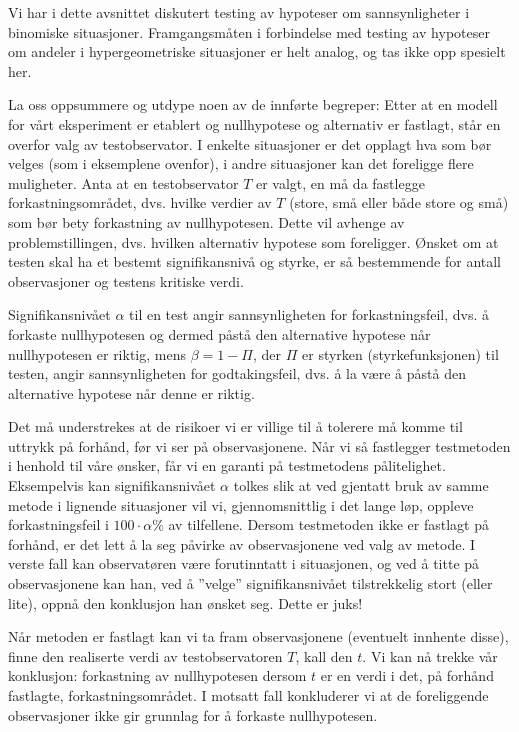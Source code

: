 Vi har i dette avsnittet diskutert
testing av hypoteser om sannsynligheter i binomiske situasjoner.
Framgangsmåten i forbindelse med testing av hypoteser om andeler
i hypergeometriske situasjoner er helt analog, og tas ikke opp
spesielt her.                                                       

La oss oppsummere og utdype noen av de innførte begreper:
Etter at en modell for vårt eksperiment er etablert og nullhypotese og
alternativ er fastlagt, står en overfor
valg av testobservator. I enkelte situasjoner er det opplagt hva
som bør velges (som i eksemplene ovenfor), i andre situasjoner kan
det foreligge flere muligheter. Anta at en testobservator $T$ er
valgt, en må da fastlegge forkastningsområdet, dvs. hvilke verdier
av $T$ (store, små eller både store og små) som bør bety
forkastning av nullhypotesen. Dette vil avhenge av
problemstillingen, dvs. hvilken alternativ hypotese som
foreligger. Ønsket om at testen skal ha et bestemt signifikansnivå
og styrke, er så bestemmende for antall observasjoner og testens kritiske
verdi.

Signifikansnivået $\alpha$ til en test angir
sannsynligheten for forkastningsfeil, dvs. å forkaste
nullhypotesen og dermed påstå den alternative hypotese når
nullhypotesen er riktig, mens $\beta =1-\Pi$, der $\Pi$ er styrken
 (styrkefunksjonen) til testen, angir sannsynligheten for godtakingsfeil,
 dvs. å la være å påstå den alternative hypotese
når denne er riktig.

Det må understrekes at de risikoer vi er villige til å tolerere må
komme til uttrykk på forhånd, før vi ser på observasjonene. 
Når vi så fastlegger testmetoden i henhold til våre ønsker, 
får vi en garanti på testmetodens pålitelighet. Eksempelvis kan
signifikansnivået $\alpha$ tolkes slik at ved gjentatt bruk av
samme metode i lignende situasjoner vil vi, gjennomsnittlig i det
lange løp, oppleve forkastningsfeil i $100\cdot \alpha \%$ av
tilfellene. Dersom testmetoden ikke er fastlagt på forhånd, er det
lett å la seg påvirke av observasjonene ved valg av metode. I
verste fall kan observatøren være forutinntatt i situasjonen,
og ved å titte på observasjonene kan han, ved å ''velge''
signifikansnivået tilstrekkelig stort (eller lite), oppnå den
konklusjon han ønsket seg. Dette er juks!

Når metoden er fastlagt kan vi ta fram observasjonene (eventuelt
innhente disse), finne den realiserte verdi av testobservatoren
 $T$, kall den $t$. Vi kan nå trekke vår konklusjon: forkastning av
nullhypotesen dersom $t$ er en verdi i det, på forhånd fastlagte,
forkastningsområdet. I motsatt fall konkluderer vi at de
foreliggende observasjoner ikke gir grunnlag for å forkaste
nullhypotesen.

